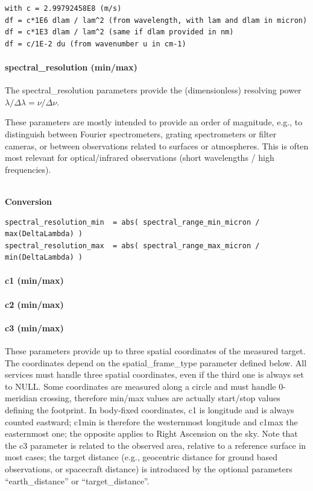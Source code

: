 \documentclass[11pt,a4paper]{ivoa}
\begin{document}
\begin{verbatim}
with c = 2.99792458E8 (m/s)
df = c*1E6 dlam / lam^2 (from wavelength, with lam and dlam in micron)
df = c*1E3 dlam / lam^2 (same if dlam provided in nm)
df = c/1E-2 du (from wavenumber u in cm-1)
\end{verbatim}

\paragraph{spectral\_resolution (min/max)}

The spectral\_resolution parameters provide the (dimensionless)
resolving power $\lambda/\Delta\lambda = \nu/\Delta\nu$.

These parameters are mostly intended to provide an order of magnitude,
e.g., to distinguish between Fourier spectrometers, grating spectrometers
or filter cameras, or between observations related to surfaces or
atmospheres. This is often most relevant for optical/infrared observations
(short wavelengths / high frequencies).

\textbf{\\}
\textbf{Conversion}

\begin{verbatim}
spectral_resolution_min  = abs( spectral_range_min_micron / max(DeltaLambda) )
spectral_resolution_max  = abs( spectral_range_max_micron / min(DeltaLambda) )
\end{verbatim}

\paragraph{c1 (min/max)}

\paragraph{c2 (min/max)}

\paragraph{c3 (min/max)}

These parameters provide up to three spatial coordinates of the measured
target. The coordinates depend on the spatial\_frame\_type parameter
defined below. All services must handle three spatial coordinates,
even if the third one is always set to NULL. Some coordinates are
measured along a circle and must handle 0-meridian crossing, therefore
min/max values are actually start/stop values defining the footprint. In
body-fixed coordinates, c1 is longitude and is always counted eastward;
c1min is therefore the westernmost longitude and c1max the easternmost
one; the opposite applies to Right Ascension on the sky. Note that the
c3 parameter is related to the observed area, relative to a reference
surface in most cases; the target distance (e.g., geocentric distance
for ground based observations, or spacecraft distance) is introduced by
the optional parameters  ``earth\_distance'' or ``target\_distance''.
\end{document}
